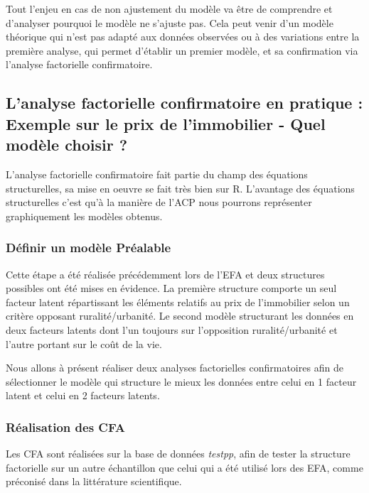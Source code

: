 \documentclass[
  french,
  11pt,
  a4paper,
]{article}
\begin{document}
Tout l'enjeu en cas de non ajustement du modèle va être de comprendre et
d'analyser pourquoi le modèle ne s'ajuste pas. Cela peut venir d'un
modèle théorique qui n'est pas adapté aux données observées ou à des
variations entre la première analyse, qui permet d'établir un premier
modèle, et sa confirmation via l'analyse factorielle confirmatoire.

\subsection{L'analyse factorielle confirmatoire en pratique : Exemple
sur le prix de l'immobilier - Quel modèle choisir
?}\label{lanalyse-factorielle-confirmatoire-en-pratique-exemple-sur-le-prix-de-limmobilier---quel-moduxe8le-choisir}

L'analyse factorielle confirmatoire fait partie du champ des équations
structurelles, sa mise en oeuvre se fait très bien sur R. L'avantage des
équations structurelles c'est qu'à la manière de l'ACP nous pourrons
représenter graphiquement les modèles obtenus.

\subsubsection{Définir un modèle
Préalable}\label{duxe9finir-un-moduxe8le-pruxe9alable}

Cette étape a été réalisée précédemment lors de l'EFA et deux structures
possibles ont été mises en évidence. La première structure comporte un
seul facteur latent répartissant les éléments relatifs au prix de
l'immobilier selon un critère opposant ruralité/urbanité. Le second
modèle structurant les données en deux facteurs latents dont l'un
toujours sur l'opposition ruralité/urbanité et l'autre portant sur le
coût de la vie.

Nous allons à présent réaliser deux analyses factorielles confirmatoires
afin de sélectionner le modèle qui structure le mieux les données entre
celui en 1 facteur latent et celui en 2 facteurs latents.

\subsubsection{Réalisation des CFA}\label{ruxe9alisation-des-cfa}

Les CFA sont réalisées sur la base de données \emph{testpp}, afin de
tester la structure factorielle sur un autre échantillon que celui qui a
été utilisé lors des EFA, comme préconisé dans la littérature
scientifique.
\end{document}
